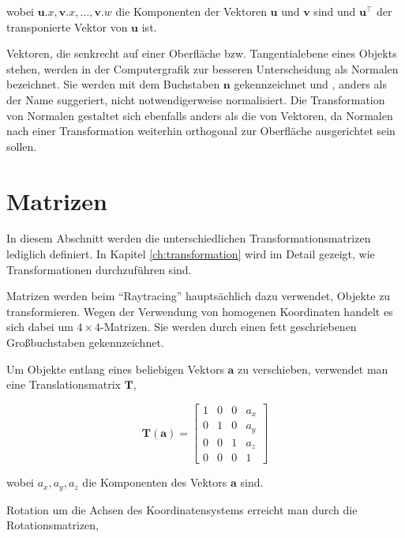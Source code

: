 wobei \( \boldsymbol{u}.x, \boldsymbol{v}.x, \dots, \boldsymbol{v}.w \) die Komponenten der Vektoren \( \boldsymbol{u} \text{ und } \boldsymbol{v} \) sind und \( \boldsymbol{u}^\intercal \) der transponierte Vektor von \( \boldsymbol{u} \) ist.


Vektoren, die senkrecht auf einer Oberfläche bzw. Tangentialebene eines Objekts stehen, werden in der Computergrafik zur besseren Unterscheidung als Normalen bezeichnet. Sie werden mit dem Buchstaben \( \boldsymbol{n} \) gekennzeichnet und , anders als der Name suggeriert, nicht notwendigerweise normalisiert. Die Transformation von Normalen gestaltet sich ebenfalls anders als die von Vektoren, da Normalen nach einer Transformation weiterhin orthogonal zur Oberfläche ausgerichtet sein sollen.


\section{Matrizen}\label{sec:matrizen}

In diesem Abschnitt werden die unterschiedlichen Transformationsmatrizen lediglich definiert. In Kapitel \ref{ch:transformation} wird im Detail gezeigt, wie Transformationen durchzuführen sind.

Matrizen werden beim "`Raytracing"' hauptsächlich dazu verwendet, Objekte zu transformieren. Wegen der Verwendung von homogenen Koordinaten handelt es sich dabei um \( 4 \times 4  \)-Matrizen. Sie werden durch einen fett geschriebenen Großbuchstaben gekennzeichnet.



Um Objekte entlang eines beliebigen Vektors \( \boldsymbol{a} \) zu verschieben, verwendet man eine Translationsmatrix \( \boldsymbol{T} \),

\begin{equation}
    \boldsymbol{T}( \boldsymbol{a} ) = 
    \begin{bmatrix}
        1 & 0 & 0 & a_x \\
        0 & 1 & 0 & a_y \\
        0 & 0 & 1 & a_z \\
        0 & 0 & 0 & 1
    \end{bmatrix}
\end{equation}

wobei \( a_x, a_y, a_z \) die Komponenten des Vektors \( \boldsymbol{a} \) sind. 

Rotation um die Achsen des Koordinatensystems erreicht man durch die Rotationsmatrizen,

